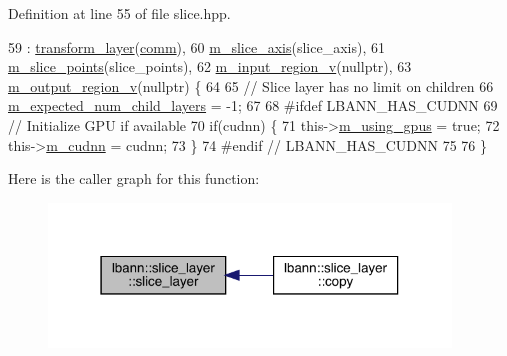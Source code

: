 Definition at line 55 of file slice.\+hpp.


\begin{DoxyCode}
59     : \hyperlink{classlbann_1_1transform__layer_a4b72501e0f4d0745c8b13c5331055e65}{transform\_layer}(\hyperlink{file__io_8cpp_ab048c6f9fcbcfaa57ce68b00263dbebe}{comm}),
60       \hyperlink{classlbann_1_1slice__layer_a349dcd71f67d77d40247da24e4641ea2}{m\_slice\_axis}(slice\_axis),
61       \hyperlink{classlbann_1_1slice__layer_af79dab13a70da2e81209e7ae15166e30}{m\_slice\_points}(slice\_points),
62       \hyperlink{classlbann_1_1slice__layer_a3e64f86a9e999d3d72867c6009aa99ba}{m\_input\_region\_v}(\textcolor{keyword}{nullptr}),
63       \hyperlink{classlbann_1_1slice__layer_a9d72208fc8136641e91cb208c38f8b65}{m\_output\_region\_v}(\textcolor{keyword}{nullptr}) \{
64 
65     \textcolor{comment}{// Slice layer has no limit on children}
66     \hyperlink{classlbann_1_1Layer_ac08f133dddd150319650e220ab9a523a}{m\_expected\_num\_child\_layers} = -1;
67 
68 \textcolor{preprocessor}{  #ifdef LBANN\_HAS\_CUDNN}
69     \textcolor{comment}{// Initialize GPU if available}
70     \textcolor{keywordflow}{if}(cudnn) \{
71       this->\hyperlink{classlbann_1_1Layer_af7881cb5eff5207c15fa835d65462e8f}{m\_using\_gpus} = \textcolor{keyword}{true};
72       this->\hyperlink{classlbann_1_1Layer_a08dbb94239e3b8c96329786c57c72e21}{m\_cudnn} = cudnn;
73     \}
74 \textcolor{preprocessor}{  #endif // LBANN\_HAS\_CUDNN}
75 
76   \}
\end{DoxyCode}
Here is the caller graph for this function\+:\nopagebreak
\begin{figure}[H]
\begin{center}
\leavevmode
\includegraphics[width=303pt]{classlbann_1_1slice__layer_a248cf99da690964ac0209684f8c13c1d_icgraph}
\end{center}
\end{figure}
\mbox{\label{classlbann_1_1slice__layer_a650cf86c43a81a644bff4b8e9375f87f}} 
